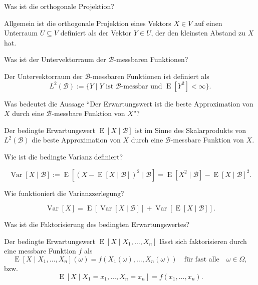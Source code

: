 \begin{QandA}
    \item Was ist die orthogonale Projektion?
    \begin{answered}
        Allgemein ist die orthogonale Projektion eines Vektors $X \in V$ auf einen Unterraum $U \subseteq V$ definiert als der Vektor $Y \in U$, der den kleinsten Abstand zu $X$ hat.
    \end{answered}

    \item Was ist der Untervektorraum der $\mathcal{B}$-messbaren Funktionen?
    \begin{answered}
        Der Untervektorraum der $\mathcal{B}$-messbaren Funktionen ist definiert als
        \[
            L^2(\mathcal{B}) := \{ Y \mid Y \text{ ist } \mathcal{B}\text{-messbar und } \operatorname{E}[Y^2] < \infty \}.
        \]
    \end{answered}

    \item Was bedeutet die Aussage \enquote{Der Erwartungswert ist die beste Approximation von $X$ durch eine $\mathcal{B}$-messbare Funktion von $X$}?
    \begin{answered}
        Der bedingte Erwartungswert $\operatorname{E}[X \mid \mathcal{B}]$ ist im Sinne des Skalarprodukts von $L^2(\mathcal{B})$ die beste Approximation von $X$ durch eine $\mathcal{B}$-messbare Funktion von $X$.
    \end{answered}

    \item Wie ist die bedingte Varianz definiert?
    \begin{answered}
        \[
            \operatorname{Var}[X \mid \mathcal{B}] := \operatorname{E}[(X - \operatorname{E}[X \mid \mathcal{B}])^2 \mid \mathcal{B}] = \operatorname{E}[X^2 \mid \mathcal{B}] - \operatorname{E}[X \mid \mathcal{B}]^2.
        \]
    \end{answered}

    \item Wie funktioniert die Varianzzerlegung?
    \begin{answered}
        \[
            \operatorname{Var}[X] = \operatorname{E}[\operatorname{Var}[X \mid \mathcal{B}]] + \operatorname{Var}[\operatorname{E}[X \mid \mathcal{B}]].
        \]
    \end{answered}

    \item Was ist die Faktorisierung des bedingten Erwartungswertes?
    \begin{answered}
        Der bedingte Erwartungswert $\operatorname{E}[X \mid X_1, \ldots, X_n]$ lässt sich faktorisieren durch eine messbare Funktion $f$ als
        \[
            \operatorname{E}[X \mid X_1, \ldots, X_n](\omega) = f(X_1(\omega), \ldots, X_n(\omega)) \quad \text{für fast alle} \quad \omega \in \Omega,
        \]
        bzw.
        \[
            \operatorname{E}[X \mid X_1 = x_1, \ldots, X_n = x_n] = f(x_1, \ldots, x_n).
        \]
    \end{answered}


\end{QandA}
